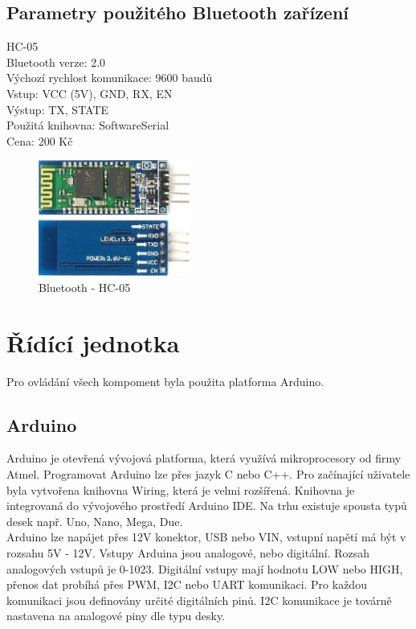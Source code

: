 \subsection{Parametry použitého Bluetooth zařízení}
HC-05\\
Bluetooth verze: 2.0\\
Výchozí rychlost komunikace: 9600 baudů\\
Vstup: VCC (5V), GND, RX, EN\\
Výstup: TX, STATE\\
Použitá knihovna: SoftwareSerial\\
Cena: 200 Kč\\

\begin{figure}[h]
	\centering
	\includegraphics[width=5cm]{pictures/blue.jpg}
	\caption{Bluetooth - HC-05}
\end{figure}

\section{Řídící jednotka} 
Pro ovládání všech kompoment byla použita platforma Arduino.

\subsection{Arduino} 
Arduino je otevřená vývojová platforma, která využívá mikroprocesory od firmy Atmel. Programovat Arduino lze přes jazyk C nebo C++. Pro začínající uživatele byla vytvořena knihovna Wiring, která je velmi rozšířená. Knihovna je integrovaná do vývojového prostředí Arduino IDE. Na trhu existuje spousta typů desek např. Uno, Nano, Mega, Due. \\
Arduino lze napájet přes 12V konektor, USB nebo VIN, vstupní napětí má být v rozsahu 5V - 12V. Vstupy Arduina jsou analogové, nebo digitální. Rozsah analogových vstupů je 0-1023. Digitální vstupy mají hodnotu LOW nebo HIGH, přenos dat probíhá přes PWM, I2C nebo UART komunikaci. Pro každou komunikaci jsou definovány určité digitálních pinů. I2C komunikace je továrně nastavena na analogové piny dle typu desky.\\

